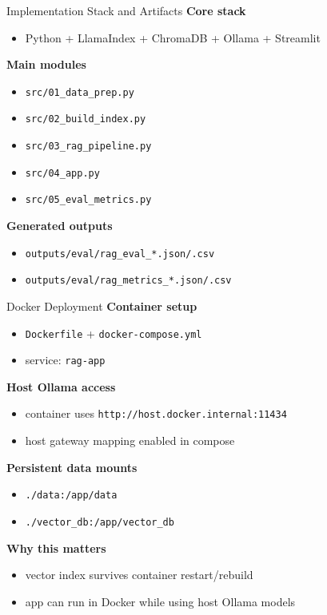 \documentclass{beamer}
\begin{document}
\begin{frame}{Implementation Stack and Artifacts}
\small
\textbf{Core stack}
\begin{itemize}
  \item Python + LlamaIndex + ChromaDB + Ollama + Streamlit
\end{itemize}

\textbf{Main modules}
\begin{itemize}
  \item \texttt{src/01\_data\_prep.py}
  \item \texttt{src/02\_build\_index.py}
  \item \texttt{src/03\_rag\_pipeline.py}
  \item \texttt{src/04\_app.py}
  \item \texttt{src/05\_eval\_metrics.py}
\end{itemize}

\textbf{Generated outputs}
\begin{itemize}
  \item \texttt{outputs/eval/rag\_eval\_*.json/.csv}
  \item \texttt{outputs/eval/rag\_metrics\_*.json/.csv}
\end{itemize}
\end{frame}

\begin{frame}{Docker Deployment}
\small
\textbf{Container setup}
\begin{itemize}
  \item \texttt{Dockerfile} + \texttt{docker-compose.yml}
  \item service: \texttt{rag-app}
\end{itemize}

\textbf{Host Ollama access}
\begin{itemize}
  \item container uses \texttt{http://host.docker.internal:11434}
  \item host gateway mapping enabled in compose
\end{itemize}

\textbf{Persistent data mounts}
\begin{itemize}
  \item \texttt{./data:/app/data}
  \item \texttt{./vector\_db:/app/vector\_db}
\end{itemize}

\textbf{Why this matters}
\begin{itemize}
  \item vector index survives container restart/rebuild
  \item app can run in Docker while using host Ollama models
\end{itemize}
\end{frame}
\end{document}
